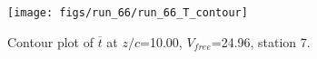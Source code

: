 \begin{figure}[H]
\centering
\texttt{[image: figs/run\_66/run\_66\_T\_contour]}
\caption{Contour plot of $\overline{t}$ at $z/c$=10.00, $V_{free}$=24.96, station 7.}
\label{fig:run_66_T_contour}
\end{figure}


